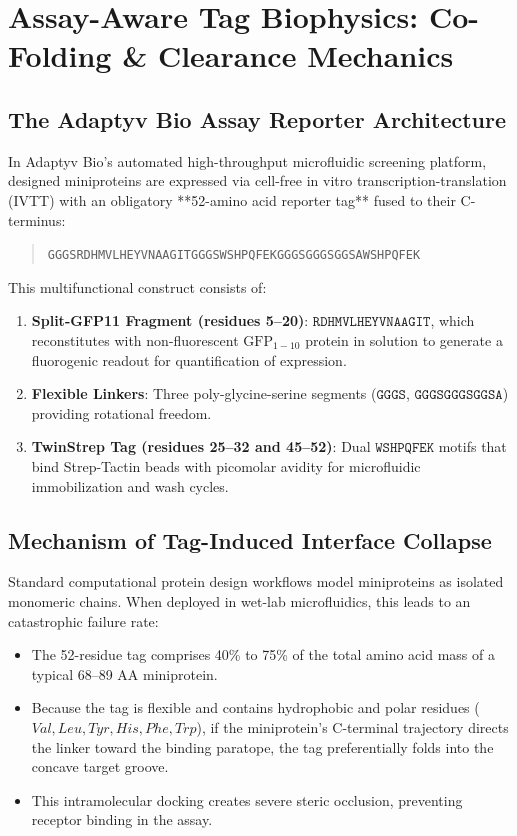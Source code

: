 \documentclass[11pt]{article}
\begin{document}
\section{Assay-Aware Tag Biophysics: Co-Folding \& Clearance Mechanics}

\subsection{The Adaptyv Bio Assay Reporter Architecture}
In Adaptyv Bio's automated high-throughput microfluidic screening platform, designed miniproteins are expressed via cell-free in vitro transcription-translation (IVTT) with an obligatory **52-amino acid reporter tag** fused to their C-terminus:
\begin{quote}
\small\texttt{GGGSRDHMVLHEYVNAAGITGGGSWSHPQFEKGGGSGGGSGGSAWSHPQFEK}
\end{quote}
This multifunctional construct consists of:
\begin{enumerate}
    \item \textbf{Split-GFP11 Fragment (residues 5--20)}: $\texttt{RDHMVLHEYVNAAGIT}$, which reconstitutes with non-fluorescent $\text{GFP}_{1-10}$ protein in solution to generate a fluorogenic readout for quantification of expression.
    \item \textbf{Flexible Linkers}: Three poly-glycine-serine segments ($\texttt{GGGS}$, $\texttt{GGGSGGGSGGSA}$) providing rotational freedom.
    \item \textbf{TwinStrep Tag (residues 25--32 and 45--52)}: Dual $\texttt{WSHPQFEK}$ motifs that bind Strep-Tactin beads with picomolar avidity for microfluidic immobilization and wash cycles.
\end{enumerate}

\subsection{Mechanism of Tag-Induced Interface Collapse}
Standard computational protein design workflows model miniproteins as isolated monomeric chains. When deployed in wet-lab microfluidics, this leads to an catastrophic failure rate:
\begin{itemize}
    \item The 52-residue tag comprises 40\% to 75\% of the total amino acid mass of a typical 68--89 AA miniprotein.
    \item Because the tag is flexible and contains hydrophobic and polar residues ($Val, Leu, Tyr, His, Phe, Trp$), if the miniprotein's C-terminal trajectory directs the linker toward the binding paratope, the tag preferentially folds into the concave target groove.
    \item This intramolecular docking creates severe steric occlusion, preventing receptor binding in the assay.
\end{itemize}
\end{document}
